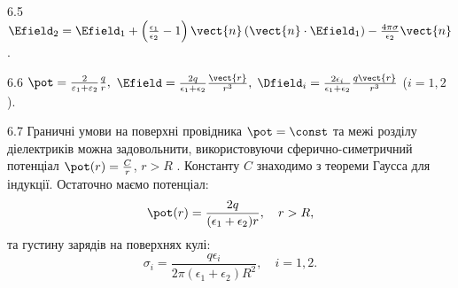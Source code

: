 \protect \section *{}
\begin{Solution}{6.{5}}
    $\Efield_2 = \Efield_1 + \left( \frac{\epsilon_1}{\epsilon _2} - 1 \right)\vect{n}\left( \vect{n} \cdot \Efield_1 \right) - \frac{4\pi \sigma }{\epsilon _2}{\vect{n}}$.
\end{Solution}
\begin{Solution}{6.{6}}
	$
		\pot  = \frac{2}{{{\varepsilon _1} + {\varepsilon _2}}}\frac{q}{r},
	$
	$
		\Efield = \frac{2q}{\epsilon_1 + \epsilon_2}\frac{\vect{r}}{r^3},
	$
	$ \Dfield_i = \frac{2\epsilon_i}{\epsilon_1 + \epsilon_2}\frac{q\vect{r}}{r^3} $ ($i = 1,2$).
\end{Solution}
\begin{Solution}{6.{7}}
	Граничні умови на поверхні провідника $\pot = \const$  та межі розділу діелектриків можна задовольнити, використовуючи сферично-симетричний потенціал  $\pot(r) = \frac{C}{r}$, $r > R$ . Константу $C$ знаходимо з теореми Гаусса для індукції. Остаточно маємо потенціал:
	\[
		\pot(r) = \frac{2q}{(\epsilon_1 + \epsilon_2)r}, \quad r > R,
	\]
	та густину зарядів на поверхнях кулі:
	\[
		\sigma_i = \frac{q\epsilon_i}{2\pi(\epsilon_1 + \epsilon_2)R^2}, \quad i = 1,2.
	\]
\end{Solution}
